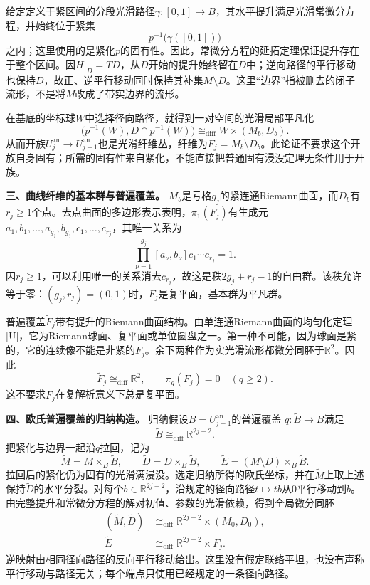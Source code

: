 给定定义于紧区间的分段光滑路径$\gamma\colon[0,1]\to B$，其水平提升满足光滑常微分方程，并始终位于紧集
\[
p^{-1}\bigl(\gamma([0,1])\bigr)
\]
之内；这里使用的是紧化$p$的固有性。因此，常微分方程的延拓定理保证提升存在于整个区间。因$H|_D=TD$，从$D$开始的提升始终留在$D$中；逆向路径的平行移动也保持$D$，故正、逆平行移动同时保持其补集$M\setminus D$。这里“边界”指被删去的闭子流形，不是将$M$改成了带实边界的流形。

在基底的坐标球$W$中选择径向路径，就得到一对空间的光滑局部平凡化
\[
\bigl(p^{-1}(W),D\cap p^{-1}(W)\bigr)
\cong_{\mathrm{diff}}W\times(M_b,D_b).
\]
从而开族$U_j^{\mathrm{an}}\to U_{j-1}^{\mathrm{an}}$也是光滑纤维丛，纤维为$F_j=M_b\setminus D_b$。此论证不要求这个开族自身固有；所需的固有性来自紧化，不能直接把普通固有浸没定理无条件用于开族。

\par\medskip\noindent\textbf{三、曲线纤维的基本群与普遍覆盖。}
$M_b$是亏格$g_j$的紧连通Riemann曲面，而$D_b$有$r_j\geq1$个点。去点曲面的多边形表示表明，$\pi_1(F_j)$有生成元
$a_1,b_1,\ldots,a_{g_j},b_{g_j},c_1,\ldots,c_{r_j}$，其唯一关系为
\[
\prod_{\nu=1}^{g_j}[a_\nu,b_\nu]c_1\cdots c_{r_j}=1.
\]
因$r_j\geq1$，可以利用唯一的关系消去$c_{r_j}$，故这是秩$2g_j+r_j-1$的自由群。该秩允许等于零：$(g_j,r_j)=(0,1)$时，$F_j$是复平面，基本群为平凡群。

普遍覆盖$\widetilde F_j$带有提升的Riemann曲面结构。由单连通Riemann曲面的均匀化定理[U]，它为Riemann球面、复平面或单位圆盘之一。第一种不可能，因为球面是紧的，它的连续像不能是非紧的$F_j$。余下两种作为实光滑流形都微分同胚于$\mathbb R^2$。因此
\[
\widetilde F_j\cong_{\mathrm{diff}}\mathbb R^2,\qquad
\pi_q(F_j)=0\quad(q\geq2).
\]
这不要求$\widetilde F_j$在复解析意义下总是复平面。

\par\medskip\noindent\textbf{四、欧氏普遍覆盖的归纳构造。}
归纳假设$B=U_{j-1}^{\mathrm{an}}$的普遍覆盖
$q\colon\widetilde B\to B$满足
\[
\widetilde B\cong_{\mathrm{diff}}\mathbb R^{2j-2}.
\]
把紧化与边界一起沿$q$拉回，记为
\[
\widetilde M=M\times_B\widetilde B,\qquad
\widetilde D=D\times_B\widetilde B,\qquad
\widetilde E=(M\setminus D)\times_B\widetilde B.
\]
拉回后的紧化仍为固有的光滑满浸没。选定归纳所得的欧氏坐标，并在$\widetilde M$上取上述保持$\widetilde D$的水平分裂。对每个$b\in\mathbb R^{2j-2}$，沿规定的径向路径$t\mapsto tb$从$0$平行移动到$b$。由完整提升和常微分方程的解对初值、参数的光滑依赖，得到全局微分同胚
\[
\begin{aligned}
(\widetilde M,\widetilde D)
&\cong_{\mathrm{diff}}\mathbb R^{2j-2}\times(M_0,D_0),\\
\widetilde E&\cong_{\mathrm{diff}}\mathbb R^{2j-2}\times F_j.
\end{aligned}
\]
逆映射由相同径向路径的反向平行移动给出。这里没有假定联络平坦，也没有声称平行移动与路径无关；每个端点只使用已经规定的一条径向路径。

